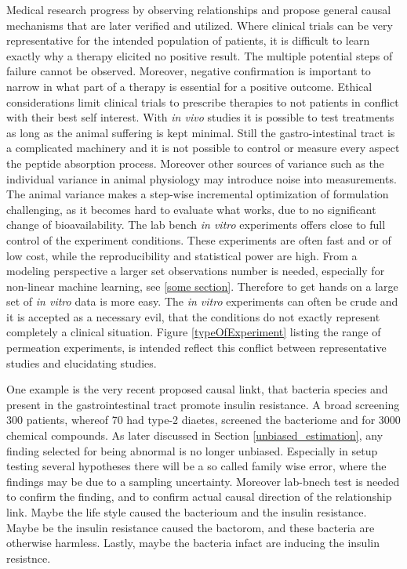 Medical research progress by observing relationships and propose general causal mechanisms that are later verified and utilized. Where clinical trials can be very representative for the intended population of patients, it is difficult to learn exactly why a therapy elicited no positive result. The multiple potential steps of failure cannot be observed. Moreover, negative confirmation is important to narrow in what part of a therapy is essential for a positive outcome. Ethical considerations limit clinical trials to prescribe therapies to not patients in conflict with their best self interest. With \textit{in vivo} studies it is possible to test treatments as long as the animal suffering is kept minimal. Still the gastro-intestinal tract is a complicated machinery and it is not possible to control or measure every aspect the peptide absorption process. Moreover other sources of variance such as the individual variance in animal physiology may introduce noise into measurements. The animal variance makes a step-wise incremental optimization of formulation challenging, as it becomes hard to evaluate what works, due to no significant change of bioavailability. The lab bench \textit{in vitro} experiments offers close to full control of the experiment conditions. These experiments are often fast and or of low cost, while the reproducibility and statistical power are high. From a modeling perspective a larger set observations number is needed, especially for non-linear machine learning, see \ref{some section}. Therefore to get hands on a large set of \textit{in vitro} data is more easy. The \textit{in vitro} experiments can often be crude and it is accepted as a necessary evil, that the conditions do not exactly represent completely a clinical situation. Figure \ref{typeOfExperiment} listing the range of permeation experiments, is intended reflect this conflict between representative studies and elucidating studies.

One example is the very recent proposed causal linkt, that bacteria species  and  present in the gastrointestinal tract promote insulin resistance. A broad screening 300 patients, whereof 70 had type-2 diaetes, screened the bacteriome and for 3000 chemical compounds. As later discussed in Section \ref{unbiased_estimation}, any finding selected for being abnormal is no longer unbiased. Especially in setup testing several hypotheses there will be a so called family wise error, where the findings may be due to a sampling uncertainty. Moreover lab-bnech test is needed to confirm the finding, and to confirm actual causal direction of the relationship link. Maybe the life style caused the bacterioum and the insulin resistance. Maybe be the insulin resistance caused the bactorom, and these bacteria are otherwise harmless. Lastly, maybe the bacteria infact are inducing the insulin resistnce.


